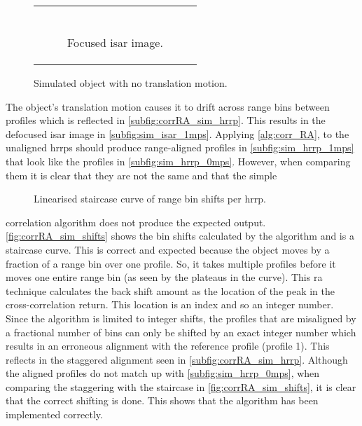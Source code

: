 \documentclass[class=report,11pt,crop=false]{standalone}
\begin{document}
\begin{figure}[h]
\begin{minipage}{0.3\linewidth}
\begin{tabular}{@{}c@{}}
\begin{subfigure}{\linewidth}
            \end{subfigure}
            \\
            \begin{subfigure}{\linewidth}
                \centering
                \resizebox{\linewidth}{!}{}
                \caption{Focused \gls{isar} image.\label{subfig:sim_isar_0mps}}
            \end{subfigure}
        \end{tabular}
        \caption{Simulated object with no translation motion. \label{fig:sim_0mps}}
    \end{minipage}
    \end{figure}

    The object's translation motion causes it to drift across range bins between profiles which is reflected in \autoref{subfig:corrRA_sim_hrrp}. This results in the defocused \gls{isar} image in \autoref{subfig:sim_isar_1mps}. Applying \autoref{alg:corr_RA}, to the unaligned \gls{hrrp}s should produce range-aligned profiles in \autoref{subfig:sim_hrrp_1mps} that look like the profiles in \autoref{subfig:sim_hrrp_0mps}. However, when comparing them it is clear that they are not the same and that the simple 
    \begin{wrapfigure}{l}{0.45\linewidth}
        \centering
        \vspace*{-\baselineskip}
        \resizebox{\linewidth}{!}{}
        \caption{Linearised staircase curve of range bin shifts per \gls{hrrp}.\label{fig:hayRA_sim_shifts}}
        \vspace*{-\baselineskip}
    \end{wrapfigure}
    correlation algorithm does not produce the expected output. \autoref{fig:corrRA_sim_shifts} shows the bin shifts calculated by the algorithm and is a staircase curve. This is correct and expected because the object moves by a fraction of a range bin over one profile. So, it takes multiple profiles before it moves one entire range bin (as seen by the plateaus in the curve). This \gls{ra} technique calculates the back shift amount as the location of the peak in the cross-correlation return. This location is an index and so an integer number. Since the algorithm is limited to integer shifts, the profiles that are misaligned by a fractional number of bins can only be shifted by an exact integer number which results in an erroneous alignment with the reference profile (profile 1). This reflects in the staggered alignment seen in \autoref{subfig:corrRA_sim_hrrp}. Although the aligned profiles do not match up with \autoref{subfig:sim_hrrp_0mps}, when comparing the staggering with the staircase in \autoref{fig:corrRA_sim_shifts}, it is clear that the correct shifting is done. This shows that the algorithm has been implemented correctly.
\end{document}
